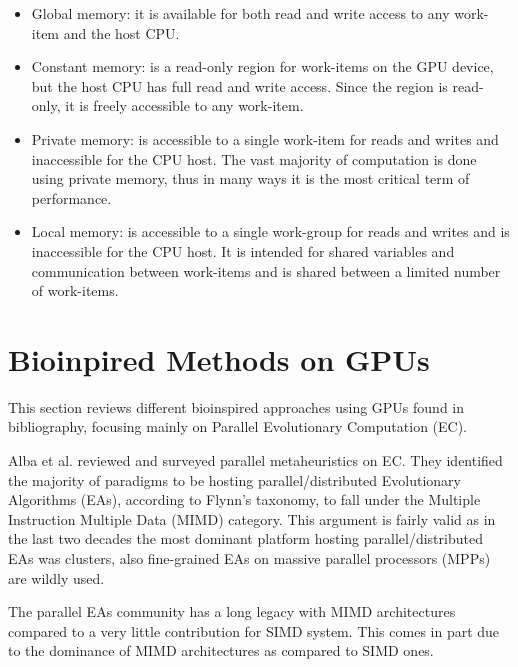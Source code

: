 \documentclass[prodmode,acmtecs]{acmsmall}
\begin{document}
\begin{itemize}
\item Global memory: it is available for both read and write access to any work-item and the host CPU.
\item Constant memory: is a read-only region for work-items on the GPU device, but the host CPU has full read and write access. Since the region is read-only, it is freely accessible to any work-item.
\item Private memory: is accessible to a single work-item for reads and writes and inaccessible for the CPU host. The vast majority of computation is done using private memory, thus in many ways it is the most critical term of performance.
\item Local memory: is accessible to a single work-group for reads and writes and is inaccessible for the CPU host. It is intended for shared variables and communication between work-items and is shared between a limited number of work-items.
\end{itemize} 


\section{Bioinpired Methods on GPUs}
\label{sec:bioinfor_apps}

This section reviews different bioinspired approaches using GPUs found in bibliography, focusing mainly on Parallel Evolutionary Computation (EC).

Alba et al. \cite{Alba2005book} reviewed and surveyed parallel metaheuristics on EC. They identified the majority of paradigms to be hosting parallel/distributed Evolutionary Algorithms (EAs), according to Flynn's taxonomy, to fall under the Multiple Instruction Multiple Data (MIMD) category. This argument is fairly valid as in the last two decades the most dominant platform hosting parallel/distributed EAs was clusters, also fine-grained EAs on massive parallel processors (MPPs) are wildly used.

The parallel EAs community has a long legacy with MIMD architectures compared to a very little contribution for SIMD system. This comes in part due to the dominance of MIMD architectures as compared to SIMD ones.
\end{document}
